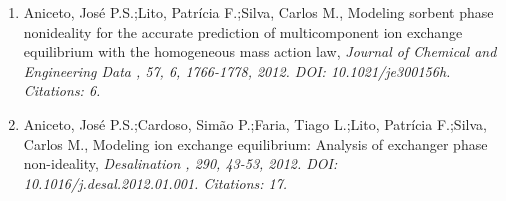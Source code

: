 \documentclass{article}
\begin{document}
\begin{enumerate}
        \item Aniceto, José P.S.;Lito, Patrícia F.;Silva, Carlos M., Modeling sorbent phase nonideality for the accurate prediction of multicomponent ion exchange equilibrium with the homogeneous mass action law, \it{ Journal of Chemical and Engineering Data }, 57, 6, 1766-1778, 2012. DOI: 10.1021/je300156h. Citations: 6. 
    
        \item Aniceto, José P.S.;Cardoso, Simão P.;Faria, Tiago L.;Lito, Patrícia F.;Silva, Carlos M., Modeling ion exchange equilibrium: Analysis of exchanger phase non-ideality, \it{ Desalination }, 290, 43-53, 2012. DOI: 10.1016/j.desal.2012.01.001. Citations: 17. 
    
\end{enumerate}
\end{document}
